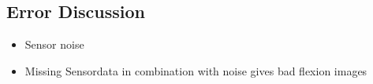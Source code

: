 \subsection{Error Discussion}

\begin{itemize}
    \item Sensor noise
    \item Missing Sensordata in combination with noise gives bad flexion images
\end{itemize}
